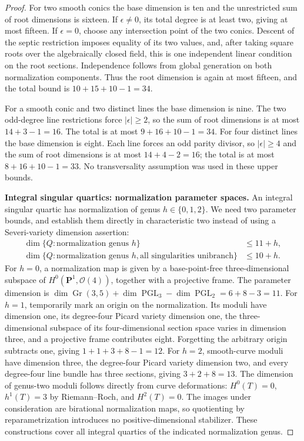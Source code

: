 \begin{proof}
For two smooth conics the base dimension is ten and the unrestricted
sum of root dimensions is sixteen.  If $\epsilon\ne0$, its total
degree is at least two, giving at most fifteen.  If
$\epsilon=0$, choose any intersection point of the two conics.
Descent of the septic restriction imposes equality of its two values,
and, after taking square roots over the algebraically closed field,
this is one independent linear condition on the root sections.
Independence follows from global generation on both normalization
components.  Thus the root dimension is again at most fifteen,
and the total bound is $10+15+10-1=34$.

For a smooth conic and two distinct lines the base dimension is
nine.  The two odd-degree line restrictions force
$|\epsilon|\ge2$, so the sum of root dimensions is at most
$14+3-1=16$.  The total is at most $9+16+10-1=34$.
For four distinct lines the base dimension is eight.  Each line
forces an odd parity divisor, so $|\epsilon|\ge4$ and the sum of
root dimensions is at most $14+4-2=16$; the total is at most
$8+16+10-1=33$.  No transversality assumption was used in these
upper bounds.

\par\smallskip\noindent\textbf{Integral singular quartics: normalization parameter spaces.}
An integral singular quartic has normalization of genus
$h\in\{0,1,2\}$.  We need two parameter bounds, and establish them
directly in characteristic two instead of using a Severi-variety
dimension assertion:
\begin{align*}
 \dim\{Q:\text{normalization genus }h\}&\le11+h,\\
 \dim\{Q:\text{normalization genus }h,
          \text{all singularities unibranch}\}&\le10+h.
\end{align*}
For $h=0$, a normalization map is given by a base-point-free
three-dimensional subspace of $H^0(\mathbf P^1,\mathcal O(4))$,
together with a projective frame.  The parameter dimension is
$\dim\operatorname{Gr}(3,5)+\dim\operatorname{PGL}_3
 -\dim\operatorname{PGL}_2=6+8-3=11$.
For $h=1$, temporarily mark an origin on the normalization.  Its
moduli have dimension one, its degree-four Picard variety dimension
one, the three-dimensional subspace of its four-dimensional section
space varies in dimension three, and a projective frame contributes
eight.  Forgetting the arbitrary origin subtracts one, giving
$1+1+3+8-1=12$.
For $h=2$, smooth-curve moduli have dimension three, the degree-four
Picard variety dimension two, and every degree-four line bundle has
three sections, giving $3+2+8=13$.
The dimension of genus-two moduli follows directly from curve
deformations: $H^0(T)=0$, $h^1(T)=3$ by Riemann--Roch, and $H^2(T)=0$.
The images under consideration are birational normalization maps,
so quotienting by reparametrization introduces no positive-dimensional
stabilizer.  These constructions cover all integral quartics of the
indicated normalization genus.


\end{proof}
